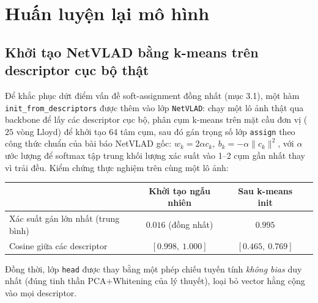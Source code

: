 \documentclass[a4paper,12pt]{article}
\begin{document}
\section{Huấn luyện lại mô hình}
\subsection{Khởi tạo NetVLAD bằng k-means trên descriptor cục bộ thật}
Để khắc phục dứt điểm vấn đề soft-assignment đồng nhất (mục 3.1), một hàm \texttt{init\_from\_descriptors} được thêm vào lớp \texttt{NetVLAD}: chạy một lô ảnh thật qua backbone để lấy các descriptor cục bộ, phân cụm k-means trên mặt cầu đơn vị ($25$ vòng Lloyd) để khởi tạo $64$ tâm cụm, sau đó gán trọng số lớp \texttt{assign} theo công thức chuẩn của bài báo NetVLAD gốc: $w_k = 2\alpha c_k,\ b_k = -\alpha \lVert c_k\rVert^2$, với $\alpha$ ước lượng để softmax tập trung khối lượng xác suất vào 1--2 cụm gần nhất thay vì trải đều. Kiểm chứng thực nghiệm trên cùng một lô ảnh:
\begin{center}
\begin{tabular}{lccc}
\toprule
& Khởi tạo ngẫu nhiên & Sau k-means init \\
\midrule
Xác suất gán lớn nhất (trung bình) & $0.016$ (đồng nhất) & $0.995$ \\
Cosine giữa các descriptor & $[0.998,\ 1.000]$ & $[0.465,\ 0.769]$ \\
\bottomrule
\end{tabular}
\end{center}
Đồng thời, lớp \texttt{head} được thay bằng một phép chiếu tuyến tính \emph{không bias} duy nhất (đúng tinh thần PCA+Whitening của lý thuyết), loại bỏ vector hằng cộng vào mọi descriptor.
\end{document}
